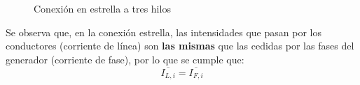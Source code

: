 \documentclass[11pt]{book} %
\begin{document}
	\begin{figure}[tbp]
		\centering
		\hfill
		\caption{Conexión en estrella a tres hilos}
		\label{fig.conexion_estrella_3}
	\end{figure}

	Se observa que, en la conexión estrella, las intensidades que pasan por los conductores (corriente de línea) son \textbf{las mismas} que las cedidas por las fases del generador (corriente de fase), por lo que se cumple que:
	\begin{equation}
	    \boxed{\overline{I_{L,i}}=\overline{I_{F,i}}}
	\end{equation}
	

	
	
\end{document}
